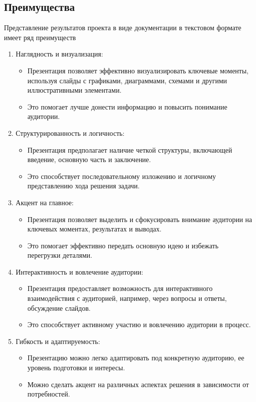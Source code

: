 \subsection*{Преимущества}
Представление результатов проекта в виде документации в текстовом формате имеет ряд преимуществ

\begin{enumerate}
\item Наглядность и визуализация:
    \begin{itemize}
        \item Презентация позволяет эффективно визуализировать ключевые моменты, используя слайды с графиками, диаграммами, схемами и другими иллюстративными элементами.
        \item Это помогает лучше донести информацию и повысить понимание аудитории.
    \end{itemize}
\item Структурированность и логичность:
    \begin{itemize}
        \item Презентация предполагает наличие четкой структуры, включающей введение, основную часть и заключение.
        \item Это способствует последовательному изложению и логичному представлению хода решения задачи.
    \end{itemize}
\item Акцент на главное:
    \begin{itemize}
        \item Презентация позволяет выделить и сфокусировать внимание аудитории на ключевых моментах, результатах и выводах.
        \item Это помогает эффективно передать основную идею и избежать перегрузки деталями.
    \end{itemize}
\item Интерактивность и вовлечение аудитории:
    \begin{itemize}
        \item Презентация предоставляет возможность для интерактивного взаимодействия с аудиторией, например, через вопросы и ответы, обсуждение слайдов.
        \item Это способствует активному участию и вовлечению аудитории в процесс.
    \end{itemize}
\item Гибкость и адаптируемость:
    \begin{itemize}
        \item Презентацию можно легко адаптировать под конкретную аудиторию, ее уровень подготовки и интересы.
        \item Можно сделать акцент на различных аспектах решения в зависимости от потребностей.
    \end{itemize}
\end{enumerate}

